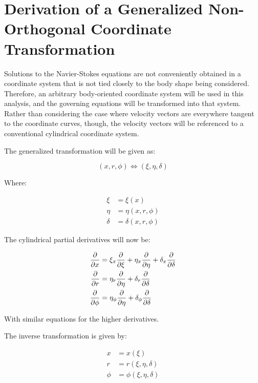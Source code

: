 \section{Derivation of a Generalized Non-Orthogonal Coordinate
Transformation}

Solutions to the Navier-Stokes equations are  not conveniently obtained in a
coordinate system that is not tied closely to the body shape being considered.
Therefore, an arbitrary body-oriented coordinate system will be used in this
analysis, and the governing equations will be transformed into that system.
Rather than considering the case where velocity vectors are everywhere tangent
to the coordinate curves, though, the velocity vectors will be referenced to a
conventional cylindrical coordinate  system.

The generalized transformation will be given as:

\begin{equation}
(x, r, \phi) \Leftrightarrow (\xi, \eta, \delta)
\end{equation}

Where:

\begin{equation}
  \begin{aligned}
    \xi &= \xi(x) \\
    \eta &= \eta(x,r,\phi) \\
    \delta &= \delta(x,r,\phi)
  \end{aligned}
\end{equation}

The cylindrical partial derivatives will now be:

\begin{equation}
  \begin{aligned}
    \pdv{x} &= \xi_x\pdv{\xi} + \eta_x\pdv{\eta} + \delta_x\pdv{\delta} \\
    \pdv{r} &= \eta_r\pdv{\eta} + \delta_r\pdv{\delta} \\
    \pdv{\phi} &= \eta_\phi\pdv{\eta} + \delta_\phi\pdv{\delta}
  \end{aligned}
\end{equation}

With similar equations for the higher derivatives.

The inverse transformation is given by:

\begin{equation}
  \begin{aligned}
    x &= x(\xi) \\
    r &= r(\xi,\eta,\delta) \\
    \phi &= \phi(\xi,\eta,\delta)
  \end{aligned}
\end{equation}

